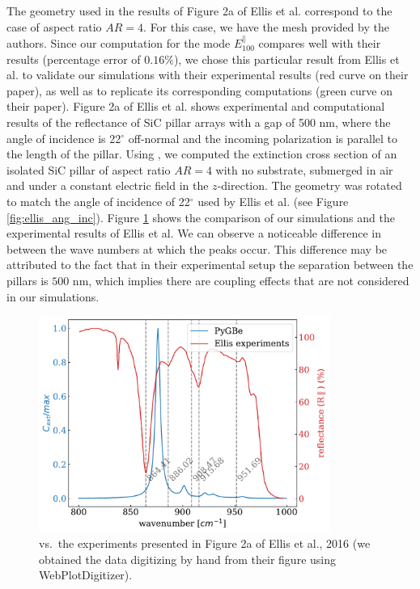 The geometry used in the results of Figure 2a of Ellis et al. correspond to the case of aspect ratio $AR=4$. For this case,
we have the mesh provided by the authors. Since our computation for the mode $E^{\parallel}_{100}$ compares well with 
their results (percentage error of $0.16\%$), we chose this particular result from Ellis et al. to validate our simulations 
with their experimental results (red curve on their paper), as well as to replicate its corresponding computations (green 
curve on their paper). Figure 2a of Ellis et al. shows experimental and computational results of the reflectance of SiC pillar 
arrays with a gap of 500 nm, where the angle of incidence is 22$^\circ$ off-normal and the incoming polarization is parallel 
to the length of the pillar. Using \pygbe, we computed the extinction cross section of an isolated SiC pillar of aspect ratio
$AR=4$ with no substrate, submerged in air and under a constant electric field in the $z$-direction. The geometry was rotated to match
the angle of incidence of 22$^\circ$ used by Ellis et al. (see Figure \ref{fig:ellis_ang_inc}). Figure \ref{fig:pygbe_vs_exp_2a} 
shows the comparison of our simulations and the experimental results of Ellis et al. We can observe a noticeable difference in between 
the wave numbers at which the peaks occur. This difference may be attributed to the fact that in their experimental setup the 
separation between the pillars is $500$ nm, which implies there are coupling effects that are not considered in our simulations.

\begin{figure}
    \centering
    \includegraphics[width=0.85\textwidth]{pygbe_vs_exp_fig2a_Ellis.pdf} 
    \caption{\pygbe vs.\ the experiments presented in Figure 2a of Ellis et al., 2016 (we obtained the data 
    digitizing by hand from their figure using WebPlotDigitizer).}
    \label{fig:pygbe_vs_exp_2a}
 \end{figure}

